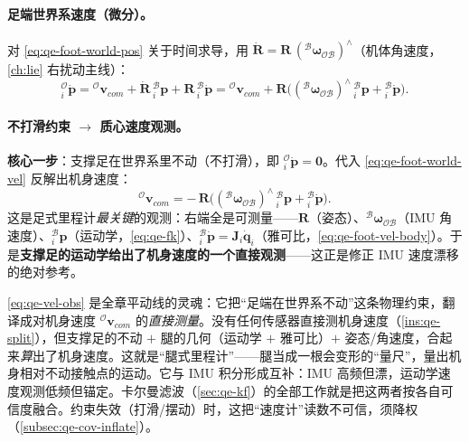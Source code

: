 \paragraph{足端世界系速度（微分）。}
对 \cref{eq:qe-foot-world-pos} 关于时间求导，用 $\dot{\mathbf{R}}=\mathbf{R}\,({}^{\mathcal{B}}\boldsymbol\omega_{\mathcal{OB}})^\wedge$（机体角速度，\cref{ch:lie} 右扰动主线）：
\begin{equation}
  {}^{\mathcal{O}}_{i}\dot{\boldsymbol p}
  = {}^{\mathcal{O}}\boldsymbol v_{com}
  + \dot{\mathbf{R}}\,{}^{\mathcal{B}}_{i}\boldsymbol p + \mathbf{R}\,{}^{\mathcal{B}}_{i}\dot{\boldsymbol p}
  = {}^{\mathcal{O}}\boldsymbol v_{com}
  + \mathbf{R}\Big(({}^{\mathcal{B}}\boldsymbol\omega_{\mathcal{OB}})^\wedge\,{}^{\mathcal{B}}_{i}\boldsymbol p + {}^{\mathcal{B}}_{i}\dot{\boldsymbol p}\Big).
  \label{eq:qe-foot-world-vel}
\end{equation}

\paragraph{不打滑约束 $\to$ 质心速度观测。}
\textbf{核心一步}：支撑足在世界系里不动（不打滑），即 ${}^{\mathcal{O}}_{i}\dot{\boldsymbol p}=\boldsymbol 0$。代入 \cref{eq:qe-foot-world-vel} 反解出机身速度\cite{yu2021quadruped}：
\begin{equation}
  \boxed{\;{}^{\mathcal{O}}\boldsymbol v_{com}
  = -\,\mathbf{R}\Big(({}^{\mathcal{B}}\boldsymbol\omega_{\mathcal{OB}})^\wedge\,{}^{\mathcal{B}}_{i}\boldsymbol p + {}^{\mathcal{B}}_{i}\dot{\boldsymbol p}\Big).\;}
  \label{eq:qe-vel-obs}
\end{equation}
这是足式里程计\emph{最关键}的观测：右端全是可测量——$\mathbf{R}$（姿态）、${}^{\mathcal{B}}\boldsymbol\omega_{\mathcal{OB}}$（IMU 角速度）、${}^{\mathcal{B}}_{i}\boldsymbol p$（运动学，\cref{eq:qe-fk}）、${}^{\mathcal{B}}_{i}\dot{\boldsymbol p}=\mathbf{J}_i\dot{\boldsymbol q}_i$（雅可比，\cref{eq:qe-foot-vel-body}）。于是\textbf{支撑足的运动学给出了机身速度的一个直接观测}——这正是修正 IMU 速度漂移的绝对参考。

\begin{insight}\label{ins:qe-noslip}
\cref{eq:qe-vel-obs} 是全章平动线的灵魂：它把“足端在世界系不动”这条物理约束，翻译成对机身速度 ${}^{\mathcal{O}}\boldsymbol v_{com}$ 的\emph{直接测量}。没有任何传感器直接测机身速度（\cref{ins:qe-split}），但支撑足的不动 $+$ 腿的几何（运动学 $+$ 雅可比）$+$ 姿态/角速度，合起来\emph{算}出了机身速度。这就是“腿式里程计”——腿当成一根会变形的“量尺”，量出机身相对不动接触点的运动。它与 IMU 积分形成互补：IMU 高频但漂，运动学速度观测低频但锚定。卡尔曼滤波（\cref{sec:qe-kf}）的全部工作就是把这两者按各自可信度融合。约束失效（打滑/摆动）时，这把“速度计”读数不可信，须降权（\cref{subsec:qe-cov-inflate}）。
\end{insight}


